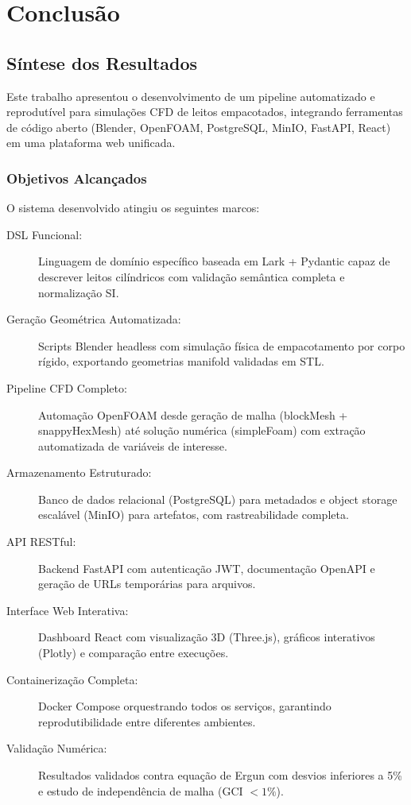 \chapter{Conclusão}
\label{cap:conclusao}

\section{Síntese dos Resultados}

Este trabalho apresentou o desenvolvimento de um pipeline automatizado e reprodutível para simulações CFD de leitos empacotados, integrando ferramentas de código aberto (Blender, OpenFOAM, PostgreSQL, MinIO, FastAPI, React) em uma plataforma web unificada.

\subsection{Objetivos Alcançados}

O sistema desenvolvido atingiu os seguintes marcos:

\begin{description}
    \item[DSL Funcional:] Linguagem de domínio específico baseada em Lark + Pydantic capaz de descrever leitos cilíndricos com validação semântica completa e normalização SI.
    
    \item[Geração Geométrica Automatizada:] Scripts Blender headless com simulação física de empacotamento por corpo rígido, exportando geometrias manifold validadas em STL.
    
    \item[Pipeline CFD Completo:] Automação OpenFOAM desde geração de malha (blockMesh + snappyHexMesh) até solução numérica (simpleFoam) com extração automatizada de variáveis de interesse.
    
    \item[Armazenamento Estruturado:] Banco de dados relacional (PostgreSQL) para metadados e object storage escalável (MinIO) para artefatos, com rastreabilidade completa.
    
    \item[API RESTful:] Backend FastAPI com autenticação JWT, documentação OpenAPI e geração de URLs temporárias para arquivos.
    
    \item[Interface Web Interativa:] Dashboard React com visualização 3D (Three.js), gráficos interativos (Plotly) e comparação entre execuções.
    
    \item[Containerização Completa:] Docker Compose orquestrando todos os serviços, garantindo reprodutibilidade entre diferentes ambientes.
    
    \item[Validação Numérica:] Resultados validados contra equação de Ergun com desvios inferiores a 5\% e estudo de independência de malha (GCI $< 1\%$).
\end{description}

